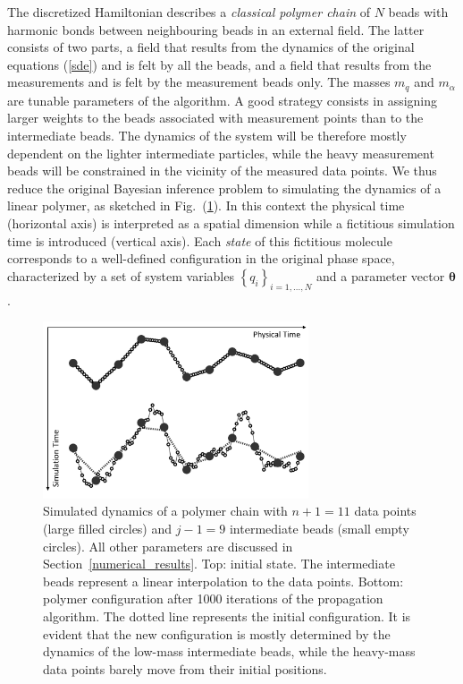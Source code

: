 \documentclass[12pt,a4paper,final]{iopart}
\newcommand{\bt}{\pmb\theta}
\begin{document}
The discretized Hamiltonian describes a {\em classical polymer chain} of $N$ beads with harmonic bonds between neighbouring beads in an external field. The latter consists of two parts, a field that results from the dynamics of the original equations (\ref{sde}) and is felt by all the beads, and a field that results from the measurements and is felt by the measurement beads only. The masses $m_q$ and $m_{\alpha}$ are tunable parameters of the algorithm. A good strategy consists in assigning larger weights to the beads associated with measurement points than to the intermediate beads. The dynamics of the system will be therefore mostly dependent on the lighter intermediate particles, while the heavy measurement beads will be constrained in the vicinity of the measured data points. We thus reduce the original Bayesian inference problem to simulating the dynamics of a linear polymer, as sketched in Fig.~(\ref{fig:polymer}). In this context the physical time (horizontal axis) is interpreted as a spatial dimension while a fictitious simulation time is introduced (vertical axis). Each \emph{state} of this fictitious molecule corresponds to a well-defined configuration in the original phase space, characterized by a set of system variables $\left\{q_i\right\}_{i=1,\dots,N}$ and a parameter vector $\bt$.

\begin{figure}[htb!]
    \centering
    \captionsetup{justification=justified}
    \includegraphics[width=0.7\textwidth]{Figs/FigPolymer.png}
    \caption{Simulated dynamics of a polymer chain with $n+1=11$ data points (large filled circles) and $j-1=9$ intermediate beads (small empty circles). All other parameters are discussed in Section~\ref{numerical_results}. Top: initial state. The intermediate beads represent a linear interpolation to the data points. Bottom: polymer configuration after 1000 iterations of the propagation algorithm. The dotted line represents the initial configuration. It is evident that the new configuration is mostly determined by the dynamics of the low-mass intermediate beads, while the heavy-mass data points barely move from their initial positions.}
    \label{fig:polymer}
\end{figure}
\end{document}
